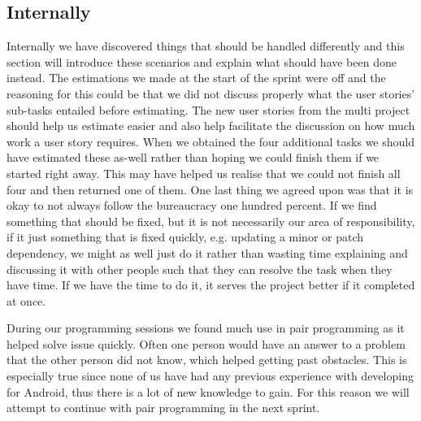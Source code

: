 \subsection{Internally}
Internally we have discovered things that should be handled differently and this section will introduce these scenarios and explain what should have been done instead.
The estimations we made at the start of the sprint were off and the reasoning for this could be that we did not discuss properly what the user stories' sub-tasks entailed before estimating.
The new user stories from the multi project should help us estimate easier and also help facilitate the discussion on how much work a user story requires.
When we obtained the four additional tasks we should have estimated these as-well rather than hoping we could finish them if we started right away.
This may have helped us realise that we could not finish all four and then returned one of them.
One last thing we agreed upon was that it is okay to not always follow the bureaucracy one hundred percent. 
If we find something that should be fixed, but it is not necessarily our area of responsibility, if it just something that is fixed quickly, e.g. updating a minor or patch dependency, we might as well just do it rather than wasting time explaining and discussing it with other people such that they can resolve the task when they have time.
If we have the time to do it, it serves the project better if it completed at once.

During our programming sessions we found much use in pair programming as it helped solve issue quickly. 
Often one person would have an answer to a problem that the other person did not know, which helped getting past obstacles. 
This is especially true since none of us have had any previous experience with developing for Android, thus there is a lot of new knowledge to gain. 
For this reason we will attempt to continue with pair programming in the next sprint. 
